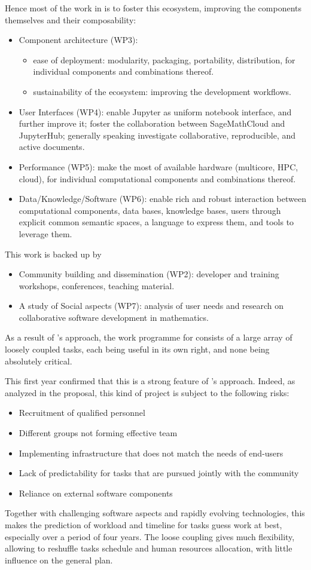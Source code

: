 \documentclass{deliverablereport}
\begin{document}
Hence most of the work in \ODK is to foster this ecosystem, improving
the components themselves and their composability:
\begin{itemize}
\item Component architecture (WP3):
  \begin{itemize}
  \item ease of deployment: modularity, packaging, portability,
    distribution, for individual components and combinations thereof.
  \item sustainability of the ecosystem: improving the development workflows.
  \end{itemize}
\item User Interfaces (WP4): enable Jupyter as uniform notebook
  interface, and further improve it; foster the collaboration between
  SageMathCloud and JupyterHub; generally speaking investigate
  collaborative, reproducible, and active documents.
\item Performance (WP5): make the most of available hardware
  (multicore, HPC, cloud), for individual computational components and
  combinations thereof.
\item Data/Knowledge/Software (WP6): enable rich and robust
  interaction between computational components, data bases, knowledge
  bases, users through explicit common semantic spaces, a language to
  express them, and tools to leverage them.
\end{itemize}
This work is backed up by
\begin{itemize}
\item Community building and dissemination (WP2): developer and
  training workshops, conferences, teaching material.
\item A study of Social aspects (WP7): analysis of user needs and
  research on collaborative software development in mathematics.
\end{itemize}

As a result of \ODK's approach, the work programme for \ODK consists
of a large array of loosely coupled tasks, each being useful in its
own right, and none being absolutely critical.

This first year confirmed that this is a strong feature of \ODK's
approach. Indeed, as analyzed in the proposal, this kind of project is
subject to the following risks:
\begin{itemize}
\item Recruitment of qualified personnel
\item Different groups not forming effective team
\item Implementing infrastructure that does not match the needs of end-users
\item Lack of predictability for tasks that are pursued jointly with
  the community
\item Reliance on external software components
\end{itemize}
Together with challenging software aspects and rapidly evolving
technologies, this makes the prediction of workload and timeline for
tasks guess work at best, especially over a period of four years. The
loose coupling gives much flexibility, allowing to reshuffle tasks
schedule and human resources allocation, with little influence on the
general plan.
\end{document}
